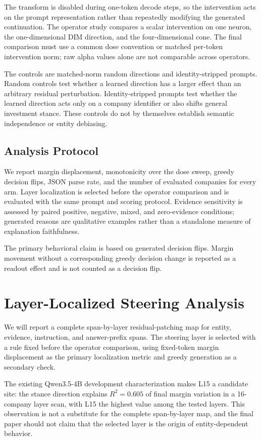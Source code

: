 \documentclass[11pt]{article}
\begin{document}
The transform is disabled during one-token decode steps, so the intervention acts on the prompt
representation rather than repeatedly modifying the generated continuation. The operator study
compares a scalar intervention on one neuron, the one-dimensional DIM direction, and the
four-dimensional cone. The final comparison must use a common dose convention or matched per-token
intervention norm; raw alpha values alone are not comparable across operators.

The controls are matched-norm random directions and identity-stripped prompts. Random controls test
whether a learned direction has a larger effect than an arbitrary residual perturbation.
Identity-stripped prompts test whether the learned direction acts only on a company identifier or
also shifts general investment stance. These controls do not by themselves establish semantic
independence or entity debiasing.

\subsection{Analysis Protocol}

We report margin displacement, monotonicity over the dose sweep, greedy decision flips, JSON parse
rate, and the number of evaluated companies for every arm. Layer localization is selected before the
operator comparison and is evaluated with the same prompt and scoring protocol. Evidence sensitivity
is assessed by paired positive, negative, mixed, and zero-evidence conditions; generated reasons are
qualitative examples rather than a standalone measure of explanation faithfulness.

The primary behavioral claim is based on generated decision flips. Margin movement without a
corresponding greedy decision change is reported as a readout effect and is not counted as a decision
flip.

\section{Layer-Localized Steering Analysis}

We will report a complete span-by-layer residual-patching map for entity, evidence, instruction, and
answer-prefix spans. The steering layer is selected with a rule fixed before the operator comparison,
using fixed-token margin displacement as the primary localization metric and greedy generation as a
secondary check.

The existing Qwen3.5-4B development characterization makes L15 a candidate site: the stance direction
explains $R^2=0.605$ of final margin variation in a 16-company layer scan, with L15 the highest value
among the tested layers. This observation is not a substitute for the complete span-by-layer map,
and the final paper should not claim that the selected layer is the origin of entity-dependent
behavior.
\end{document}
